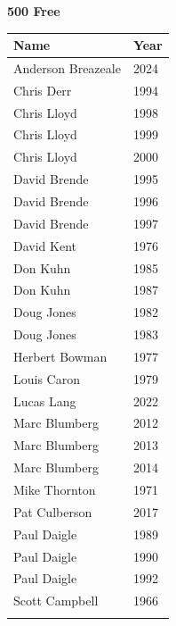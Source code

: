 \hfill
\clearpage
\begin{minipage}[t]{0.48\textwidth}
\centering
\textbf{\textcolor{teamprimary}{500 Free}}\par
\vspace{0.5em}
\centering
\small
\renewcommand{\arraystretch}{1.0}
\setlength{\tabcolsep}{4pt}
\begin{tabular}{@{}p{3.0cm}p{1.0cm}@{}}
\toprule
\textbf{Name} & \textbf{Year} \\
\midrule
Anderson Breazeale & 2024 \\
Chris Derr & 1994 \\
Chris Lloyd & 1998 \\
Chris Lloyd & 1999 \\
Chris Lloyd & 2000 \\
David Brende & 1995 \\
David Brende & 1996 \\
David Brende & 1997 \\
David Kent & 1976 \\
Don Kuhn & 1985 \\
Don Kuhn & 1987 \\
Doug Jones & 1982 \\
Doug Jones & 1983 \\
Herbert Bowman & 1977 \\
Louis Caron & 1979 \\
Lucas Lang & 2022 \\
Marc Blumberg & 2012 \\
Marc Blumberg & 2013 \\
Marc Blumberg & 2014 \\
Mike Thornton & 1971 \\
Pat Culberson & 2017 \\
Paul Daigle & 1989 \\
Paul Daigle & 1990 \\
Paul Daigle & 1992 \\
Scott Campbell & 1966 \\
\bottomrule
\vspace{0.5em}
\end{tabular}
\end{minipage}
\vspace{1.2em}
